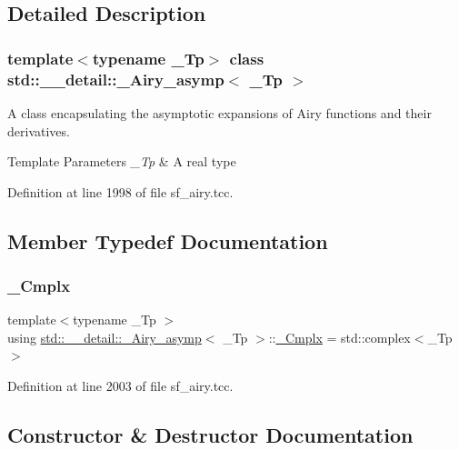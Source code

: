 \subsection{Detailed Description}
\subsubsection*{template$<$typename \+\_\+\+Tp$>$\newline
class std\+::\+\_\+\+\_\+detail\+::\+\_\+\+Airy\+\_\+asymp$<$ \+\_\+\+Tp $>$}

A class encapsulating the asymptotic expansions of Airy functions and their derivatives.


\begin{DoxyTemplParams}{Template Parameters}
{\em \+\_\+\+Tp} & A real type \\
\hline
\end{DoxyTemplParams}


Definition at line 1998 of file sf\+\_\+airy.\+tcc.



\subsection{Member Typedef Documentation}
\mbox{\label{classstd_1_1____detail_1_1__Airy__asymp_ae28f102423d34e78502ab6da42d67f50}} 
\subsubsection{\texorpdfstring{\+\_\+\+Cmplx}{\_Cmplx}}
{\footnotesize\ttfamily template$<$typename \+\_\+\+Tp $>$ \\
using \hyperlink{classstd_1_1____detail_1_1__Airy__asymp}{std\+::\+\_\+\+\_\+detail\+::\+\_\+\+Airy\+\_\+asymp}$<$ \+\_\+\+Tp $>$\+::\hyperlink{classstd_1_1____detail_1_1__Airy__asymp_ae28f102423d34e78502ab6da42d67f50}{\+\_\+\+Cmplx} =  std\+::complex$<$\+\_\+\+Tp$>$}



Definition at line 2003 of file sf\+\_\+airy.\+tcc.



\subsection{Constructor \& Destructor Documentation}
\mbox{\label{classstd_1_1____detail_1_1__Airy__asymp_a93f2010a2c48be2f38445420ba019a52}} 
